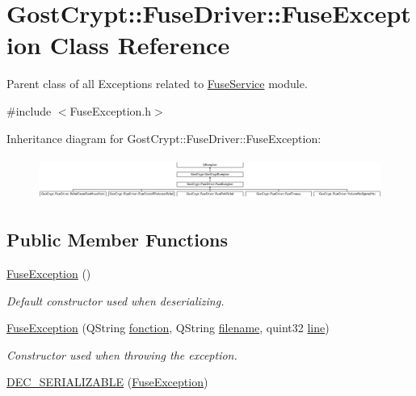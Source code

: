 \hypertarget{class_gost_crypt_1_1_fuse_driver_1_1_fuse_exception}{}\section{Gost\+Crypt\+:\+:Fuse\+Driver\+:\+:Fuse\+Exception Class Reference}
\label{class_gost_crypt_1_1_fuse_driver_1_1_fuse_exception}


Parent class of all Exceptions related to \hyperlink{class_gost_crypt_1_1_fuse_driver_1_1_fuse_service}{Fuse\+Service} module.  




{\ttfamily \#include $<$Fuse\+Exception.\+h$>$}

Inheritance diagram for Gost\+Crypt\+:\+:Fuse\+Driver\+:\+:Fuse\+Exception\+:\begin{figure}[H]
\begin{center}
\leavevmode
\includegraphics[height=1.404389cm]{class_gost_crypt_1_1_fuse_driver_1_1_fuse_exception}
\end{center}
\end{figure}
\subsection*{Public Member Functions}
\begin{DoxyCompactItemize}
\item 
\hyperlink{class_gost_crypt_1_1_fuse_driver_1_1_fuse_exception_a0f642ddf77d3236d254eeced3744a71e}{Fuse\+Exception} ()
\begin{DoxyCompactList}\small\item\em Default constructor used when deserializing. \end{DoxyCompactList}\item 
\hyperlink{class_gost_crypt_1_1_fuse_driver_1_1_fuse_exception_a2073126a77599988df14ead75cebaf01}{Fuse\+Exception} (Q\+String \hyperlink{class_gost_crypt_1_1_gost_crypt_exception_a29b8c93d5efbb1ff369107385725a939}{fonction}, Q\+String \hyperlink{class_gost_crypt_1_1_gost_crypt_exception_a749a12375f4ba9d502623b99d8252f38}{filename}, quint32 \hyperlink{class_gost_crypt_1_1_gost_crypt_exception_abf506d911f12a4e969eea500f90bd32c}{line})
\begin{DoxyCompactList}\small\item\em Constructor used when throwing the exception. \end{DoxyCompactList}\item 
\hyperlink{class_gost_crypt_1_1_fuse_driver_1_1_fuse_exception_a9e484bd1c55627664542200c8ff2d291}{D\+E\+C\+\_\+\+S\+E\+R\+I\+A\+L\+I\+Z\+A\+B\+LE} (\hyperlink{class_gost_crypt_1_1_fuse_driver_1_1_fuse_exception}{Fuse\+Exception})
\end{DoxyCompactItemize}
